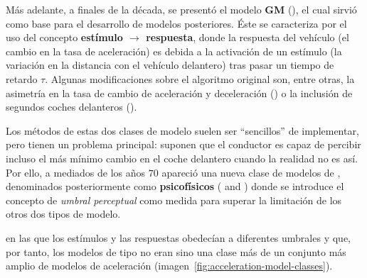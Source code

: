 Más adelante, a finales de la década, se presentó el modelo \textbf{GM} (\cite{Chandler1958}), el cual sirvió como base para el desarrollo de modelos posteriores. Éste se caracteriza por el uso del concepto \textbf{estímulo $\rightarrow$ respuesta}, donde la respuesta del vehículo (el cambio en la tasa de aceleración) es debida a la activación de un estímulo (la variación en la distancia con el vehículo delantero) tras pasar un tiempo de retardo $\tau$. Algunas modificaciones sobre el algoritmo original son, entre otras, la asimetría en la tasa de cambio de aceleración y deceleración (\cite{Gazis1959}) o la inclusión de segundos coches delanteros (\cite{Bexelius1968}).

Los métodos de estas dos clases de modelo suelen ser \enquote{sencillos} de implementar, pero tienen un problema principal: suponen que el conductor es capaz de percibir incluso el más mínimo cambio en el coche delantero cuando la realidad no es así. Por ello, a mediados de los años $70$ apareció una nueva clase de modelos de \textit{}, denominados posteriormente como \textbf{psicofísicos} (\cite{wiedemann1974simulation} and \cite{Leutzbach1988}) donde se introduce el concepto de \textit{umbral perceptual} como medida para superar la limitación de los otros dos tipos de modelo.

 en las que los estímulos y las respuestas obedecían a diferentes umbrales y que, por tanto, los modelos de tipo \textit{} no eran sino una clase más de un conjunto más amplio de modelos de aceleración (imagen~\ref{fig:acceleration-model-classes}).

